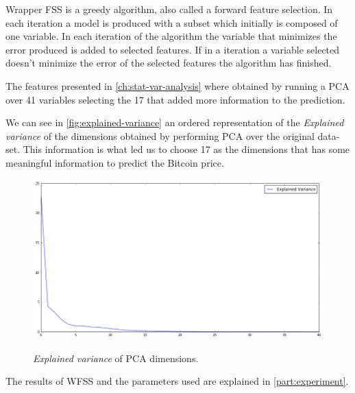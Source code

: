 Wrapper FSS is a greedy algorithm, also called a forward feature
selection. In each iteration a model is produced with a subset which
initially is composed of one variable. In each iteration of the
algorithm the variable that minimizes the error produced is added to
selected features. If in a iteration a variable selected doesn't
minimize the error of the selected features the algorithm has
finished.

The features presented in \autoref{ch:stat-var-analysis} where
obtained by running a PCA over 41 variables selecting the 17 that
added more information to the prediction.

We can see in \autoref{fig:explained-variance} an ordered
representation of the \textit{Explained variance} of the dimensions
obtained by performing PCA over the original data-set. This
information is what led us to choose 17 as the dimensions that has
some meaningful information to predict the Bitcoin price.

\begin{figure}[bth]
  \myfloatalign
  {\includegraphics[width=1\linewidth]
    {gfx/explained-variance}}
  \caption{\textit{Explained variance} of PCA dimensions.}
  \label{fig:explained-variance}
\end{figure}

The results of WFSS and the parameters used are explained
in \autoref{part:experiment}.



